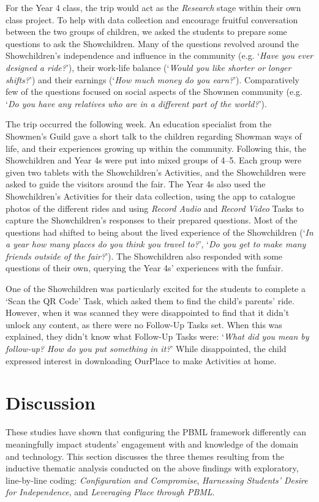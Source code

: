 For the Year 4 class, the trip would act as the \textit{Research} stage within their own class project. To help with data collection and encourage fruitful conversation between the two groups of children, we asked the students to prepare some questions to ask the Showchildren. Many of the questions revolved around the Showchildren's independence and influence in the community (e.g. `\textit{Have you ever designed a ride?}'), their work-life balance (`\textit{Would you like shorter or longer shifts?}') and their earnings (`\textit{How much money do you earn?}'). Comparatively few of the questions focused on social aspects of the Showmen community (e.g. `\textit{Do you have any relatives who are in a different part of the world?}').

The trip occurred the following week. An education specialist from the Showmen's Guild gave a short talk to the children regarding Showman ways of life, and their experiences growing up within the community. Following this, the Showchildren and Year 4s were put into mixed groups of 4--5. Each group were given two tablets with the Showchildren's Activities, and the Showchildren were asked to guide the visitors around the fair. The Year 4s also used the Showchildren's Activities for their data collection, using the app to catalogue photos of the different rides and using \textit{Record Audio} and \textit{Record Video} Tasks to capture the Showchildren's responses to their prepared questions. Most of the questions had shifted to being about the lived experience of the Showchildren (`\textit{In a year how many places do you think you travel to?}', `\textit{Do you get to make many friends outside of the fair?}'). The Showchildren also responded with some questions of their own, querying the Year 4s' experiences with the funfair.

One of the Showchildren was particularly excited for the students to complete a `Scan the QR Code' Task, which asked them to find the child's parents' ride. However, when it was scanned they were disappointed to find that it didn't unlock any content, as there were no Follow-Up Tasks set. When this was explained, they didn't know what Follow-Up Tasks were: `\textit{What did you mean by follow-up? How do you put something in it?}' While disappointed, the child expressed interest in downloading OurPlace to make Activities at home.

\section{Discussion}
These studies have shown that configuring the PBML framework differently can meaningfully impact students' engagement with and knowledge of the domain and technology. This section discusses the three themes resulting from the inductive thematic analysis conducted on the above findings with exploratory, line-by-line coding: \textit{Configuration and Compromise}, \textit{Harnessing Students' Desire for Independence}, and \textit{Leveraging Place through PBML}. 

